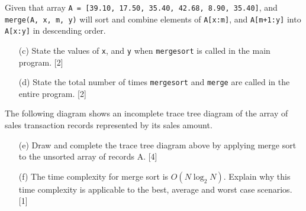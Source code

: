 Given that array \texttt{A = {[}39.10, 17.50, 35.40, 42.68, 8.90,
35.40{]}}, and \texttt{merge(A, x, m, y)} will sort and combine elements
of \texttt{A{[}x:m{]}}, and \texttt{A{[}m+1:y{]}} into \texttt{A{[}x:y{]}}
in descending order. 
\begin{enumerate}
\item[(c)]  State the values of \texttt{x}, and \texttt{y} when \texttt{mergesort}
is called in the main program.\hfill{} {[}2{]}
\item[(d)]  State the total number of times \texttt{mergesort} and \texttt{merge}
are called in the entire program.\hfill{} {[}2{]}
\end{enumerate}
The following diagram shows an incomplete trace tree diagram of the
array of sales transaction records represented by its sales amount. 
\begin{enumerate}
\item[(e)]  Draw and complete the trace tree diagram above by applying merge
sort to the unsorted array of records A. \hfill{}{[}4{]}
\item[(f)]  The time complexity for merge sort is $O(N\log_{2}N)$. Explain
why this time complexity is applicable to the best, average and worst
case scenarios.\hfill{} {[}1{]}
\end{enumerate}
